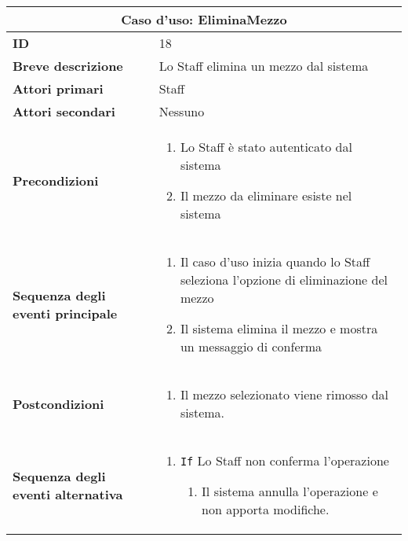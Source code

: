 \documentclass[a4paper]{report}
\begin{document}
\clearpage
\begin{table}[H]
\vspace*{-0cm}
\renewcommand{\arraystretch}{1.9}
\begin{tabular}{|p{3.9cm}|p{9.9cm}|}
\hline
\multicolumn{2}{|c|}{\textbf{Caso d’uso: EliminaMezzo}} \\ \hline
	\textbf{ID} & 18 \\ \hline
	\textbf{Breve descrizione} & Lo Staff elimina un mezzo dal sistema \\ \hline
	\textbf{Attori primari} & Staff \\ \hline
	\textbf{Attori secondari} & Nessuno \\ \hline
	\textbf{Precondizioni} & \begin{enumerate}[label=\arabic*.,leftmargin=14pt,labelsep=0.5em,topsep=0pt,partopsep=0pt,parsep=0pt,itemsep=0pt]
        \item Lo Staff è stato autenticato dal sistema
        \item Il mezzo da eliminare esiste nel sistema
    \end{enumerate} \\ \hline
	\textbf{Sequenza degli eventi principale} & 
\begin{enumerate}[leftmargin=14pt,label=\arabic*.,labelsep=0.5em,topsep=0pt,partopsep=0pt,parsep=0pt,itemsep=0pt]
    \item Il caso d'uso inizia quando lo Staff seleziona l’opzione di eliminazione del mezzo
    \item Il sistema elimina il mezzo e mostra un messaggio di conferma
\end{enumerate}\\ \hline
    	\textbf{Postcondizioni} & \begin{enumerate}[label=\arabic*.,leftmargin=14pt,labelsep=0.5em,topsep=0pt,partopsep=0pt,parsep=0pt,itemsep=0pt]
        \item Il mezzo selezionato viene rimosso dal sistema.
        \end{enumerate} \\ \hline
    	\textbf{Sequenza degli eventi alternativa} & \begin{enumerate}[leftmargin=14pt,label=\arabic*.,labelsep=0.5em,topsep=0pt,partopsep=0pt,parsep=0pt,itemsep=0pt]
    \item \texttt{If} Lo Staff non conferma l’operazione
    \begin{enumerate}[label=\arabic{enumi}.\arabic*.,leftmargin=22pt,labelsep=0.5em,topsep=0pt,partopsep=0pt,parsep=0pt,itemsep=0pt]
        \item Il sistema annulla l’operazione e non apporta modifiche.
    \end{enumerate}
\end{enumerate} \\ \hline
\end{tabular}
\end{table}
\end{document}
